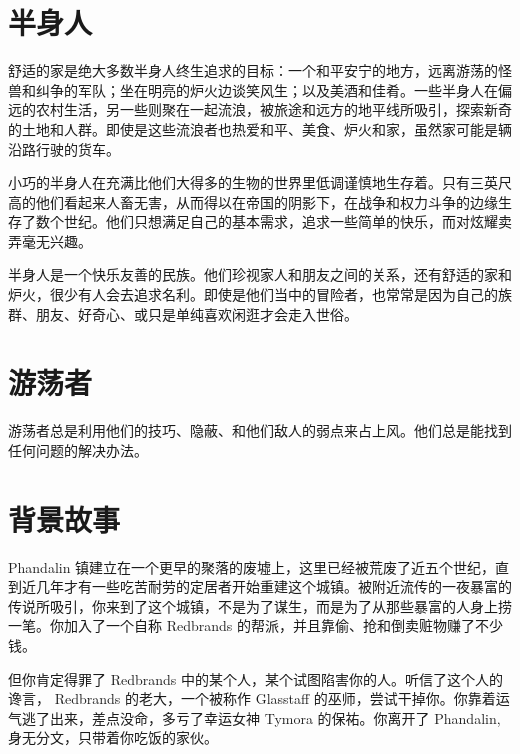 \documentclass[letterpaper,twocolumn,openany,nodeprecatedcode]{dndbook}
\begin{document}



\mainmatter%

\section{半身人}

\small
舒适的家是绝大多数半身人终生追求的目标：一个和平安宁的地方，远离游荡的怪兽和纠争的军队；坐在明亮的炉火边谈笑风生；以及美酒和佳肴。一些半身人在偏远的农村生活，另一些则聚在一起流浪，被旅途和远方的地平线所吸引，探索新奇的土地和人群。即使是这些流浪者也热爱和平、美食、炉火和家，虽然家可能是辆沿路行驶的货车。

小巧的半身人在充满比他们大得多的生物的世界里低调谨慎地生存着。只有三英尺高的他们看起来人畜无害，从而得以在帝国的阴影下，在战争和权力斗争的边缘生存了数个世纪。他们只想满足自己的基本需求，追求一些简单的快乐，而对炫耀卖弄毫无兴趣。

半身人是一个快乐友善的民族。他们珍视家人和朋友之间的关系，还有舒适的家和炉火，很少有人会去追求名利。即使是他们当中的冒险者，也常常是因为自己的族群、朋友、好奇心、或只是单纯喜欢闲逛才会走入世俗。

\section{游荡者}

游荡者总是利用他们的技巧、隐蔽、和他们敌人的弱点来占上风。他们总是能找到任何问题的解决办法。

\section{背景故事}

Phandalin 镇建立在一个更早的聚落的废墟上，这里已经被荒废了近五个世纪，直到近几年才有一些吃苦耐劳的定居者开始重建这个城镇。被附近流传的一夜暴富的传说所吸引，你来到了这个城镇，不是为了谋生，而是为了从那些暴富的人身上捞一笔。你加入了一个自称 Redbrands 的帮派，并且靠偷、抢和倒卖赃物赚了不少钱。

但你肯定得罪了 Redbrands 中的某个人，某个试图陷害你的人。听信了这个人的谗言， Redbrands 的老大，一个被称作 Glasstaff 的巫师，尝试干掉你。你靠着运气逃了出来，差点没命，多亏了幸运女神 Tymora 的保祐。你离开了 Phandalin, 身无分文，只带着你吃饭的家伙。
\end{document}
